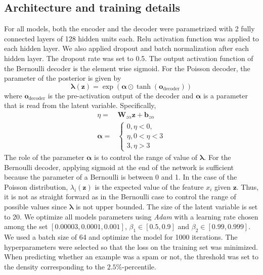 \documentclass[10pt]{article}
\begin{document}
\subsection{Architecture and training details}
For all models, both the encoder and the decoder were parametrized with 2 fully connected layers of 128 hidden units each. Relu activation function was applied to each hidden layer. We also applied dropout and batch normalization after each hidden layer. The dropout rate was set to 0.5. The output activation function of the Bernoulli decoder is the element wise sigmoid. For the Poisson decoder, the parameter of the posterior is given by 
\begin{equation}
	\bm{\lambda}(\mathbf{z}) = \exp(\bm{\alpha} \odot \tanh(\mathbf{o}_{\text{decoder}}))
\end{equation}
where $\mathbf{o}_{\text{decoder}}$ is the pre-activation output of the decoder and $\bm{\alpha}$ is a parameter that is read from the latent variable. Specifically,
\begin{equation}
	\begin{split}
	\eta =& \mathbf{W}_{z\alpha}\mathbf{z}+\mathbf{b}_{z\alpha}\\
	\bm{\alpha} =& 
		\begin{cases}
		0, \eta < 0,\\
		\eta, 0<\eta<3\\
		3, \eta > 3 
		\end{cases}
	\end{split}
\end{equation}
 The role of the parameter $\bm{\alpha}$ is to control the range of value of $\bm{\lambda}$. For the Bernoulli decoder, applying sigmoid at the end of the network is sufficient because the parameter of a Bernoulli is between 0 and 1. In the case of the Poisson distribution, $\lambda_i(\mathbf{z})$ is the expected value of the feature $x_i$ given $\mathbf{z}$. Thus, it is not as straight forward as in the Bernoulli case to control the range of possible values since $\bm{\lambda}$ is not upper bounded. The size of the latent variable is set to 20. We optimize all models parameters using \emph{Adam} \cite{2014arXiv1412.6980K} with a learning rate chosen among the set $[0.00003, 0.0001, 0.001]$, $\beta_1\in [0.5, 0.9]$ and $\beta_2 \in [0.99, 0.999]$. We used a batch size of 64 and optimize the model for 1000 iterations. The hyperparameters were selected so that the loss on the training set was minimized. When predicting whether an example was a spam or not, the threshold was set to the density corresponding to the $2.5\%$-percentile.
\end{document}

